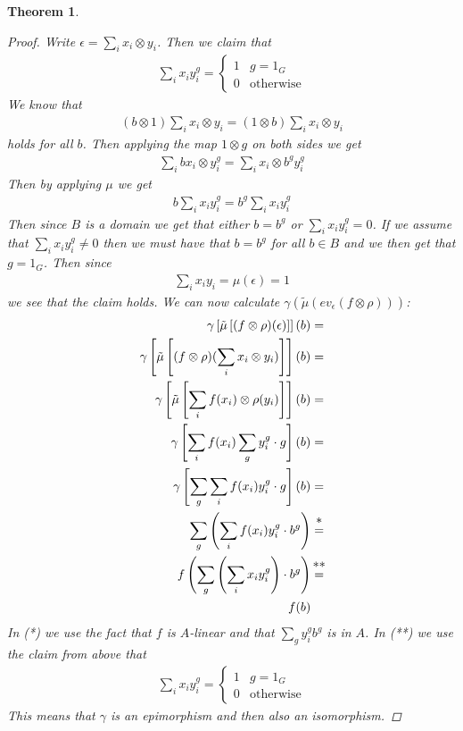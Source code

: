 \documentclass[11pt, a4paper, english]{article}
\newtheorem{theorem}{Theorem}[section]
\theoremstyle{definition}
\begin{document}
\begin{theorem}
\begin{proof}
Write $\epsilon = \sum\limits_i x_i \otimes y_i$. Then we claim that
\begin{align*}
\sum_i x_i y_i^g = \begin{cases}
1 & g = 1_G\\
0 & \text{otherwise}
\end{cases}
\end{align*}
We know that
\begin{align*}
(b \otimes 1)\sum_i x_i \otimes y_i = (1 \otimes b)\sum_i x_i \otimes y_i
\end{align*}
holds for all $b$. Then applying the map $1 \otimes g$ on both sides we get
\begin{align*}
\sum_i bx_i \otimes y_i^g = \sum_i x_i \otimes b^gy_i^g
\end{align*}
Then by applying $\mu$ we get
\begin{align*}
b\sum_i x_i y_i^g = b^g\sum_i x_i  y_i^g
\end{align*}
Then since $B$ is a domain we get that either $b = b^g$ or $\sum_i x_i  y_i^g = 0$. If we assume that $\sum_i x_i  y_i^g \neq 0$ then we must have that $b = b^g$ for all $b \in B$ and we then get that $g = 1_G$. Then since
\begin{align*}
\sum_i x_i  y_i = \mu(\epsilon) = 1
\end{align*}
we see that the claim holds. We can now calculate $\gamma(\tilde{\mu}(ev_\epsilon(f \otimes \rho)))$:
\begin{align*}
\gamma \left[ \tilde{\mu} \left[ (f \otimes \rho)(\epsilon) \right] \right] (b) &=\\
\gamma \left[ \tilde{\mu} \left[ (f \otimes \rho)(\sum_i x_i \otimes y_i) \right] \right] (b) &=\\
\gamma \left[ \tilde{\mu} \left[ \sum_i f(x_i) \otimes \rho(y_i) \right] \right] (b) &=\\
\gamma \left[ \sum_i f(x_i) \sum_g y_i^g \cdot g \right] (b) &=\\
\gamma \left[ \sum_g \sum_i f(x_i) y_i^g \cdot g \right] (b) &=\\
\sum_g \left(\sum_i f(x_i) y_i^g \cdot b^g \right) &\stackrel{\mathclap{\normalfont\mbox{*}}}{=}\\
f \left( \sum_g \left(\sum_i x_i y_i^g \right) \cdot b^g \right) &\stackrel{\mathclap{\normalfont\mbox{**}}}{=}\\
f(b) &
\end{align*}
In (*) we use the fact that $f$ is $A$-linear and that $\sum_g y_i^g b^g$ is in $A$. In (**) we use the claim from above that
\begin{align*}
\sum_i x_i y_i^g = \begin{cases}
1 & g = 1_G\\
0 & \text{otherwise}
\end{cases}
\end{align*}
This means that $\gamma$ is an epimorphism and then also an isomorphism.
\end{proof}
\end{theorem}
\end{document}
